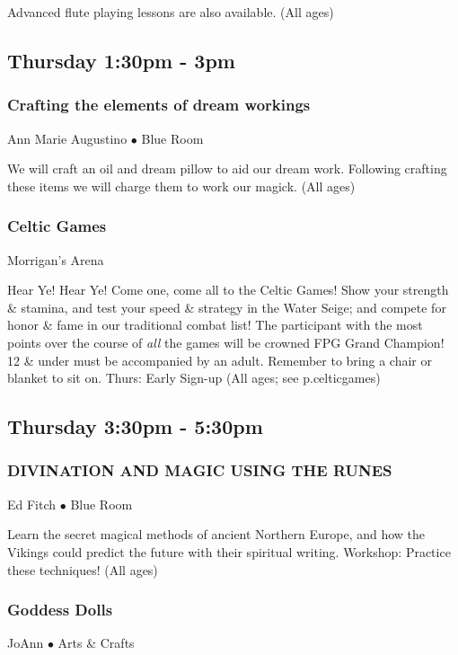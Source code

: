 Advanced flute playing lessons are also available. {\small (All ages)}

\subsection{Thursday 1:30pm - 3pm}

\subsubsection{Crafting the elements of dream workings}
\label{Thu-AMA2}
{\small Ann Marie Augustino $\bullet$  Blue Room}

 We will craft an oil and dream pillow to aid our dream work.  Following crafting these items we will charge them to work our magick. {\small (All ages)}

\subsubsection{Celtic Games}
\label{Thu-Celts1}
{\small  Morrigan's Arena}

 Hear Ye! Hear Ye! Come one, come all to the Celtic Games! Show your strength \& stamina, and test your speed \& strategy in the Water Seige; and compete for honor \& fame in our traditional combat list!  The participant with the most points over the course of \textit{all} the games will be crowned FPG Grand Champion! 12 \& under must be accompanied by an adult.  Remember to bring a chair or blanket to sit on. Thurs: Early Sign-up {\small (All ages; see p.{celticgames})}

\subsection{Thursday 3:30pm - 5:30pm}

\subsubsection{DIVINATION AND MAGIC USING THE RUNES}
\label{Thu-Fitch4}
{\small Ed Fitch $\bullet$  Blue Room}

 Learn the secret magical methods of ancient Northern Europe, and how the Vikings could predict the future with their spiritual writing. Workshop: Practice these techniques! {\small (All ages)}

\subsubsection{Goddess Dolls}
\label{Thu-JoAnn1}
{\small JoAnn $\bullet$  Arts \& Crafts}

